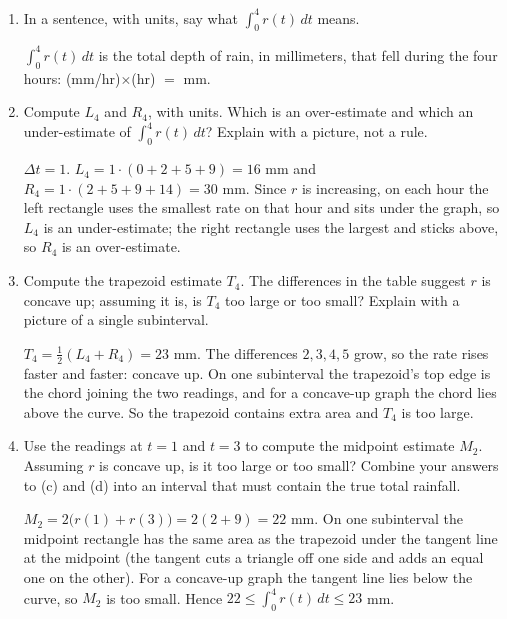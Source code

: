 \documentclass[11pt]{article}
\begin{document}
\begin{enumerate}
\item {\color{gray!55!black}In a sentence, with units, say what $\int_0^4 r(t)\,dt$ means.}

\smallskip
$\int_0^4r(t)\,dt$ is the total depth of rain, in millimeters, that fell during the
four hours: (mm/hr)$\times$(hr) $=$ mm.
\item {\color{gray!55!black}Compute $L_4$ and $R_4$, with units. Which is an over-estimate and which an
under-estimate of $\int_0^4 r(t)\,dt$? Explain with a picture, not a rule.}

\smallskip
$\Delta t=1$. $L_4=1\cdot(0+2+5+9)=16$ mm and $R_4=1\cdot(2+5+9+14)=30$ mm. Since $r$
is increasing, on each hour the left rectangle uses the smallest rate on that hour and
sits under the graph, so $L_4$ is an under-estimate; the right rectangle uses the largest
and sticks above, so $R_4$ is an over-estimate.
\item {\color{gray!55!black}Compute the trapezoid estimate $T_4$. The differences in the table suggest $r$ is
concave up; assuming it is, is $T_4$ too large or too small? Explain with a picture of a
single subinterval.}

\smallskip
$T_4=\tfrac12(L_4+R_4)=23$ mm. The differences $2,3,4,5$ grow, so the rate rises faster
and faster: concave up. On one subinterval the trapezoid's top edge is the chord joining
the two readings, and for a concave-up graph the chord lies above the curve. So the
trapezoid contains extra area and $T_4$ is too large.
\item {\color{gray!55!black}Use the readings at $t=1$ and $t=3$ to compute the midpoint estimate $M_2$. Assuming
$r$ is concave up, is it too large or too small? Combine your answers to (c) and (d) into
an interval that must contain the true total rainfall.}

\smallskip
$M_2=2\big(r(1)+r(3)\big)=2(2+9)=22$ mm. On one subinterval the midpoint rectangle has
the same area as the trapezoid under the tangent line at the midpoint (the tangent cuts a
triangle off one side and adds an equal one on the other). For a concave-up graph the
tangent line lies below the curve, so $M_2$ is too small. Hence
$22\le\int_0^4r(t)\,dt\le23$ mm.
\end{enumerate}
\end{document}
